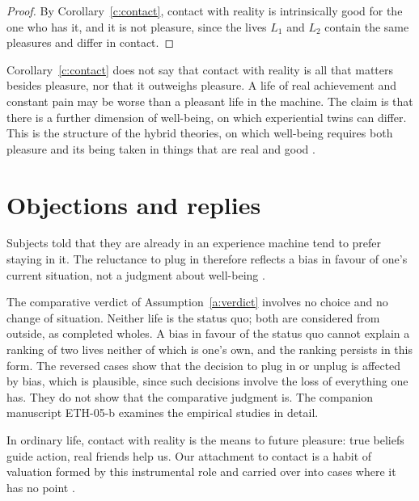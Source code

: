 \documentclass{situationist-preprint}
\begin{document}
\begin{proof}
By Corollary~\ref{c:contact}, contact with reality is intrinsically good for the one who has it, and it is not pleasure, since the lives $L_1$ and $L_2$ contain the same pleasures and differ in contact.
\end{proof}

Corollary~\ref{c:contact} does not say that contact with reality is all that matters besides pleasure, nor that it outweighs pleasure. A life of real achievement and constant pain may be worse than a pleasant life in the machine. The claim is that there is a further dimension of well-being, on which experiential twins can differ. This is the structure of the hybrid theories, on which well-being requires both pleasure and its being taken in things that are real and good \citep{Parfit1984}.

\section{Objections and replies}

\begin{objection}\label{o:sqb}
Subjects told that they are already in an experience machine tend to prefer staying in it. The reluctance to plug in therefore reflects a bias in favour of one's current situation, not a judgment about well-being \citep{deBrigard2010}.
\end{objection}

\begin{reply}
The comparative verdict of Assumption~\ref{a:verdict} involves no choice and no change of situation. Neither life is the status quo; both are considered from outside, as completed wholes. A bias in favour of the status quo cannot explain a ranking of two lives neither of which is one's own, and the ranking persists in this form. The reversed cases show that the decision to plug in or unplug is affected by bias, which is plausible, since such decisions involve the loss of everything one has. They do not show that the comparative judgment is. The companion manuscript ETH-05-b examines the empirical studies in detail.
\end{reply}

\begin{objection}\label{o:instr}
In ordinary life, contact with reality is the means to future pleasure: true beliefs guide action, real friends help us. Our attachment to contact is a habit of valuation formed by this instrumental role and carried over into cases where it has no point \citep{Silverstein2000,Crisp2006}.
\end{objection}
\end{document}
